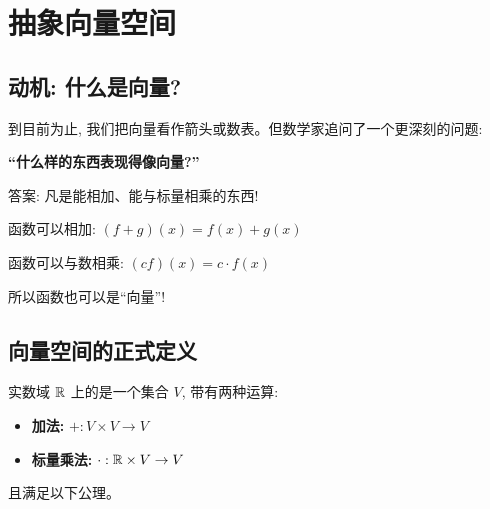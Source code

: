 
\chapter{抽象向量空间}
\label{ch:abstract}

\begin{abstract}
在最后一章中, 我们把向量的概念推广到几何箭头之外。我们将看到, 函数、多项式乃至音乐都可以是``向量''——只要它们遵循线性代数的规则。
\end{abstract}

\section{动机: 什么是向量?}

\begin{intuition}
到目前为止, 我们把向量看作箭头或数表。但数学家追问了一个更深刻的问题:

\textbf{``什么样的东西表现得像向量?''}

答案: 凡是能相加、能与标量相乘的东西!
\end{intuition}

\begin{example}
函数可以相加: $(f + g)(x) = f(x) + g(x)$

函数可以与数相乘: $(cf)(x) = c \cdot f(x)$

所以函数也可以是``向量''!
\end{example}

\section{向量空间的正式定义}

\begin{definition}[向量空间]
实数域 $\mathbb{R}$ 上的是一个集合 $V$, 带有两种运算:
\begin{itemize}
    \item \textbf{加法:} $+ : V \times V \to V$
    \item \textbf{标量乘法:} $\cdot : \mathbb{R} \times V \to V$
\end{itemize}
且满足以下公理。
\end{definition}

